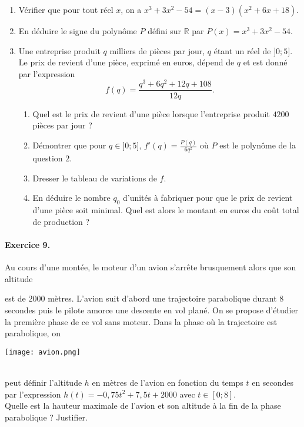 \documentclass[11pt]{article}
\begin{document}
\begin{enumerate}
  \item Vérifier que pour tout réel $x$, on a $x^3+3x^2-54 = (x-3)(x^2+6x+18)$.
  \item En déduire le signe du polynôme $P$ défini sur $\mathbb{R}$ par
    $P(x)=x^3+3x^2-54$.
  \item Une entreprise produit $q$ milliers de pièces par jour, $q$ étant un
  réel de $]0;5]$. Le prix de revient d'une pièce, exprimé en euros, dépend de
  $q$ et est donné par l'expression
  \[
    f(q) = \frac{q^3+6q^2+12q+108}{12q}.
  \] 
  \begin{enumerate}
    \item Quel est le prix de revient d'une pièce lorsque l'entreprise produit
      $4200$ pièces par jour ?
  \item Démontrer que pour $q\in]0;5]$, $f'(q)=\frac{P(q)}{6q^2}$ où $P$ est le
    polynôme de la question $2$.
  \item Dresser le tableau de variations de $f$.
  \item En déduire le nombre $q_0$ d'unités à fabriquer pour que le prix de
    revient d'une pièce soit minimal. Quel est alors le montant en euros du coût
    total de production ?
  \end{enumerate}
\end{enumerate}

\paragraph{Exercice 9.} Au cours d'une montée, le moteur d’un avion s’arrête
brusquement alors que son altitude\\[1mm]
\begin{minipage}[]{.5\textwidth}
est de $2000$ mètres. L’avion suit d’abord une
trajectoire parabolique durant 8 secondes puis le pilote amorce une descente en
vol plané. On se propose d’étudier la première phase de ce vol sans moteur. Dans
la phase où la trajectoire est parabolique, on
\end{minipage}
\begin{minipage}{.5\textwidth}
  \begin{center}
\texttt{[image: avion.png]}
  \end{center}
\end{minipage}\\[1mm]
peut définir l'altitude $h$ en mètres de l'avion en fonction du temps $t$ en
secondes par l'expression $h(t) = -0,75t^2+7,5t+2000$ avec $t\in[0;8]$.\\Quelle
est la hauteur maximale de l'avion et son altitude à la fin de la phase
parabolique ? Justifier.
\end{document}
